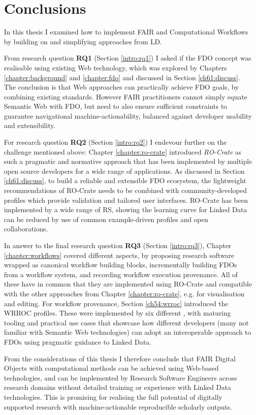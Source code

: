 \section{Conclusions}

In this thesis I examined how to implement \acrshort{FAIR}  and Computational Workflows by building on and simplifying approaches from \acrlong{LD}.

From research question \textbf{RQ1} (Section \vref{intro:rq1}) I asked if the 
\acrfull{FDO}
concept was realisable using existing Web technology, which was explored by Chapters \ref{chapter:background} and \ref{chapter:fdo} and discussed in Section \ref{ch61:discuss}. The conclusion is that Web approaches can practically achieve FDO goals, by combining existing standards. However FAIR practitioners cannot simply equate Semantic Web with FDO, but need to also ensure sufficient constraints to guarantee navigational machine-actionability, balanced against developer usability and extensibility. 

For research question \textbf{RQ2} (Section \vref{intro:rq2}) I endevour further on the challenge mentioned above: Chapter \ref{chapter:ro-crate} introduced \emph{RO-Crate} as such a pragmatic and normative approach that has been implemented by multiple open source developers for a wide range of applications. As discussed in Section \ref{ch61:discuss}, to build a reliable and extensible FDO ecosystem, the lightweight recommendations of RO-Crate needs to be combined with community-developed profiles which provide validation and tailored user interfaces. RO-Crate has been implemented by a wide range of \acrlong{RS}, showing the learning curve for Linked Data can be reduced by use of common example-driven profiles and open collaborations. 

In answer to the final research question \textbf{RQ3} (Section \vref{intro:rq3}), Chapter \ref{chapter:workflows} covered different aspects, by proposing research software wrapped as canonical workflow building blocks, incrementally building FDOs from a workflow system, and recording workflow execution provenance. All of these have in common that they are implemented using RO-Crate and compatible with the other approaches from Chapter \ref{chapter:ro-crate}, e.g. for visualisation and editing. For workflow provenance, Section \vref{ch54:wrroc} introduced the 
\acrfull{WRROC} profiles. These were implemented by six different , with maturing tooling and practical use cases that showcase how different developers (many not familiar with Semantic Web technologies) can adopt an interoperable approach to FDOs using pragmatic guidance to Linked Data.

From the considerations of this thesis I therefore conclude that FAIR Digital Objects with  computational methods can be achieved using Web-based technologies, and can be implemented by Research Software Engineers across research domains without detailed training or experience with Linked Data technologies. This is promising for realising the full potential of digitally supported research with machine-actionable reproducible scholarly outputs.